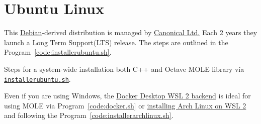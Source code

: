 \section{Ubuntu Linux}

This \href{https://www.debian.org}{Debian}-derived distribution is
managed by \href{https://canonical.com}{Canonical Ltd.}
Each 2 years they launch a Long Term Support(LTS) release.
The steps are outlined in the Program~\ref{code:installerubuntu.sh}.

\begin{listing}[ht!]
	\tiny
	\centering
	\caption{Steps for a system-wide installation both C++ and Octave
		MOLE library vía \href{https://raw.githubusercontent.com/carlosal1015/mole_examples/main/tutorial/installerubuntu.sh}{\texttt{installerubuntu.sh}}.}
	\label{code:installerubuntu.sh}
\end{listing}

Even if you are using Windows, the
\href{https://docs.docker.com/desktop/features/wsl}{Docker Desktop WSL 2 backend}
is ideal for using MOLE via Program~\ref{code:docker.sh} or
\href{https://wiki.archlinux.org/title/Install_Arch_Linux_on_WSL}{installing Arch Linux on WSL 2}
and following the Program~\ref{code:installerarchlinux.sh}.
